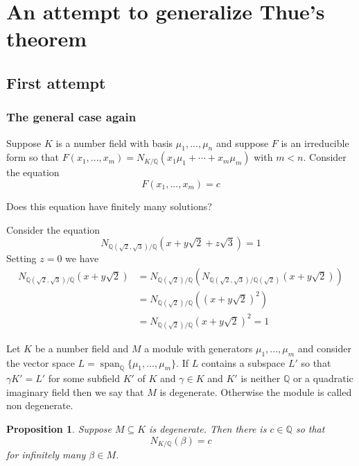 \documentclass{beamer}
\newtheorem{proposition}{Proposition}
\newcommand{\Span}{\operatorname{span}}
\newcommand{\mbb}[1]{\mathbb{#1}}
\numberwithin{equation}{section}
\begin{document}
\section{An attempt to generalize Thue's theorem}
\subsection{First attempt}
\begin{frame}
	\frametitle{The general case again}
	Suppose $K$ is a number field with basis $\mu_1, ..., \mu_n$ and suppose $F$ is an irreducible form so that 
	$F(x_1, ..., x_m) = N_{K/\mbb Q}(x_1 \mu_1 + \cdots + x_m \mu_m)$ with $m < n$. Consider the equation 
	$$F(x_1, ..., x_m) = c$$ 

	Does this equation have finitely many solutions?

\end{frame}

\begin{frame}
	Consider the equation 
	$$N_{\mbb Q(\sqrt 2, \sqrt 3)/\mbb Q}(x + y\sqrt 2 + z \sqrt 3) = 1$$ %
	Setting $z = 0$ we have
	\begin{align*}
		N_{\mbb Q(\sqrt 2, \sqrt 3) / \mbb Q}(x + y \sqrt 2) &= N_{\mbb Q(\sqrt 2)/\mbb Q}(N_{\mbb Q(\sqrt 2, \sqrt 3) / \mbb Q(\sqrt 2)}(x + y\sqrt 2)) \\
		&= N_{\mbb Q(\sqrt 2)/\mbb Q}((x + y\sqrt 2)^2) \\
		&= N_{\mbb Q(\sqrt 2)/\mbb Q}(x + y\sqrt 2)^2
		= 1
	\end{align*}
\end{frame}

\begin{frame}
	\begin{definition}\label{def: Degenerate module}
		Let $K$ be a number field and $M$ a module with generators $\mu_1, ..., \mu_m$ and consider the vector space $L = \Span_{\mbb Q}\{\mu_1, ..., \mu_m \}$. If $L$ contains a subspace $L'$ so that $\gamma K' = L'$ for some subfield $K'$ of $K$ and $\gamma \in K$ and $K'$ is neither $\mbb Q$ or a quadratic imaginary field then we say that $M$ is degenerate. Otherwise the module is called non degenerate.
	\end{definition}
\end{frame}

\begin{frame}
	\begin{proposition}
		Suppose $M \subseteq K$ is degenerate. Then there is $c \in \mbb Q$ so that 
		$$N_{K/\mbb Q}(\beta) = c$$ 
		for infinitely many $\beta \in M$. 
	\end{proposition}
\end{frame}
\end{document}
